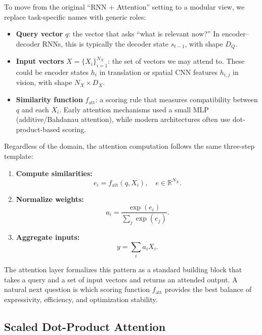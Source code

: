 \noindent
To move from the original ``RNN + Attention'' setting to a modular view, we replace task-specific names with generic roles:
\begin{itemize}
	\item \textbf{Query vector} \(q\): the vector that asks ``what is relevant now?''
	In encoder--decoder RNNs, this is typically the decoder state \(s_{t-1}\), with shape \(D_Q\).
	\item \textbf{Input vectors} \(X = \{X_i\}_{i=1}^{N_X}\): the set of vectors we may attend to.
	These could be encoder states \(h_i\) in translation or spatial CNN features \(h_{i,j}\) in vision, with shape \(N_X \times D_X\).
	\item \textbf{Similarity function} \(f_{\text{att}}\): a scoring rule that measures compatibility between \(q\) and each \(X_i\).
	Early attention mechanisms used a small MLP (additive/Bahdanau attention), while modern architectures often use dot-product-based scoring.
\end{itemize}

\noindent
Regardless of the domain, the attention computation follows the same three-step template:
\begin{enumerate}
	\item \textbf{Compute similarities:}
	\begin{equation}
		e_i = f_{\text{att}}(q, X_i),
		\quad
		e \in \mathbb{R}^{N_X}.
	\end{equation}
	\item \textbf{Normalize weights:}
	\begin{equation}
		a_i = \frac{\exp(e_i)}{\sum_j \exp(e_j)}.
	\end{equation}
	\item \textbf{Aggregate inputs:}
	\begin{equation}
		y = \sum_{i} a_i X_i.
	\end{equation}
\end{enumerate}

\noindent
The attention layer formalizes this pattern as a standard building block that takes a query and a set of input vectors and returns an attended output.
A natural next question is which scoring function \(f_{\text{att}}\) provides the best balance of expressivity, efficiency, and optimization stability.

\subsection{Scaled Dot-Product Attention}
\label{subsec:chapter17_scaled_dot_product}

